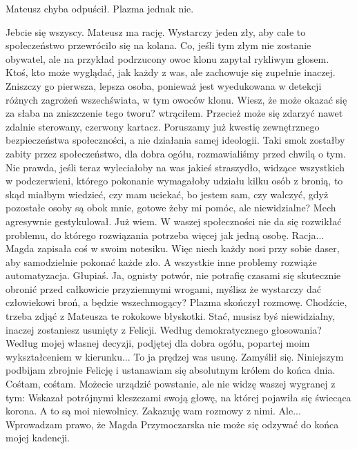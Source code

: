 Mateusz chyba odpuścił. Plazma jednak nie.
\begin{dialogue}
\ds{} Jebcie się wszyscy. Mateusz ma rację. Wystarczy jeden zły, aby całe to społeczeństwo przewróciło się na kolana. 
Co, jeśli tym złym nie zostanie obywatel, ale na przykład podrzucony owoc klonu \dm{} zapytał rykliwym głosem. \dm{} 
Ktoś, kto może wyglądać, jak każdy z was, ale zachowuje się zupełnie inaczej.
\ds{} Zniszczy go pierwsza, lepsza osoba, ponieważ jest wyedukowana w detekcji różnych zagrożeń wszechświata, w tym owoców klonu.
\ds{} Wiesz, że może okazać się za słaba na zniszczenie tego tworu? \dm{} wtrąciłem. \dm{} Przecież może się zdarzyć nawet zdalnie sterowany, czerwony kartacz.
\ds{} Poruszamy już kwestię zewnętrznego bezpieczeństwa społeczności, a nie działania samej ideologii. 
Taki smok zostałby zabity przez społeczeństwo, dla dobra ogółu, rozmawialiśmy przed chwilą o tym.
\ds{} Nie prawda, jeśli teraz wyleciałoby na was jakieś straszydło, widzące wszystkich w podczerwieni, którego pokonanie wymagałoby udziału kilku osób z bronią, to skąd miałbym wiedzieć, czy mam uciekać, bo jestem sam, czy walczyć, gdyż pozostałe osoby są obok mnie, gotowe żeby mi pomóc, ale niewidzialne? \dm{} Mech agresywnie gestykulował. \dm{} 
Już wiem. W waszej społeczności nie da się rozwikłać problemu, do którego rozwiązania potrzeba więcej jak jedną osobę.
\ds{} Racja... \dm{} Magda zapisała coś w swoim notesiku. \dm{} Więc niech każdy nosi przy sobie daser, aby samodzielnie pokonać każde zło. A wszystkie inne problemy rozwiąże automatyzacja.
\ds{} Głupiaś. Ja, ognisty potwór, nie potrafię czasami się skutecznie obronić przed całkowicie przyziemnymi wrogami, myślisz że wystarczy dać człowiekowi broń, a będzie wszechmogący? \dm{} 
Plazma skończył rozmowę. \dm{} Chodźcie, trzeba zdjąć z Mateusza te rokokowe błyskotki.
\ds{} Stać, musisz byś niewidzialny, inaczej zostaniesz usunięty z Felicji.
\ds{} Według demokratycznego głosowania?
\ds{} Według mojej własnej decyzji, podjętej dla dobra ogółu, popartej moim wykształceniem w kierunku...
\ds{} To ja prędzej was usunę. \dm{} Zamyślił się. \dm{} Niniejszym podbijam zbrojnie Felicję i ustanawiam się absolutnym królem do końca dnia. Cośtam, cośtam. 
Możecie urządzić powstanie, ale nie widzę waszej wygranej z tym: \dm{} Wskazał potrójnymi kleszczami swoją głowę, na której pojawiła się świecąca korona. \dm{} 
A to są moi niewolnicy. Zakazuję wam rozmowy z nimi.
\ds{} Ale...
\ds{} Wprowadzam prawo, że Magda Przymoczarska nie może się odzywać do końca mojej kadencji.
\end{dialogue}

